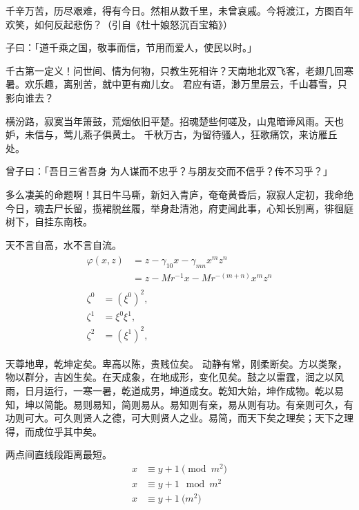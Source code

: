 \documentclass[../Main/thesis.tex]{subfiles}
\begin{document}
千辛万苦，历尽艰难，得有今日。然相从数千里，未曾哀戚。今将渡江，方图百年欢笑，如何反起悲伤？（引自《杜十娘怒沉百宝箱》）

\begin{definition}
  子曰：「道千乘之国，敬事而信，节用而爱人，使民以时。」
\end{definition}

千古第一定义！问世间、情为何物，只教生死相许？天南地北双飞客，老翅几回寒暑。欢乐趣，离别苦，就中更有痴儿女。
君应有语，渺万里层云，千山暮雪，只影向谁去？

横汾路，寂寞当年箫鼓，荒烟依旧平楚。招魂楚些何嗟及，山鬼暗谛风雨。天也妒，未信与，莺儿燕子俱黄土。
千秋万古，为留待骚人，狂歌痛饮，来访雁丘处。

\begin{proposition}
  曾子曰：「吾日三省吾身 \pozhehao 为人谋而不忠乎？与朋友交而不信乎？传不习乎？」
\end{proposition}

多么凄美的命题啊！其日牛马嘶，新妇入青庐，奄奄黄昏后，寂寂人定初，我命绝今日，魂去尸长留，揽裙脱丝履，举身赴清池，府吏闻此事，心知长别离，徘徊庭树下，自挂东南枝。

\begin{remark}
  天不言自高，水不言自流。
  \begin{gather*}
    \begin{split}
      \varphi(x,z)
      &=z-\gamma_{10}x-\gamma_{mn}x^mz^n\\
      &=z-Mr^{-1}x-Mr^{-(m+n)}x^mz^n
    \end{split}\\[6pt]
    \begin{align} \zeta^0 & =(\xi^0)^2,  \\
      \zeta^1 & =\xi^0\xi^1, \\
      \zeta^2 & =(\xi^1)^2,
    \end{align}
  \end{gather*}
\end{remark}

天尊地卑，乾坤定矣。卑高以陈，贵贱位矣。 动静有常，刚柔断矣。方以类聚，物以群分，吉凶生矣。在天成象，在地成形，变化见矣。鼓之以雷霆，润之以风雨，日月运行，一寒一暑，乾道成男，坤道成女。乾知大始，坤作成物。乾以易知，坤以简能。易则易知，简则易从。易知则有亲，易从则有功。有亲则可久，有功则可大。可久则贤人之德，可大则贤人之业。易简，而天下矣之理矣；天下之理得，而成位乎其中矣。

\begin{axiom}
  两点间直线段距离最短。
  \begin{align}
    x & \equiv y+1\pmod{m^2} \\
    x & \equiv y+1\mod{m^2}  \\
    x & \equiv y+1\pod{m^2}
  \end{align}
\end{axiom}
\end{document}
